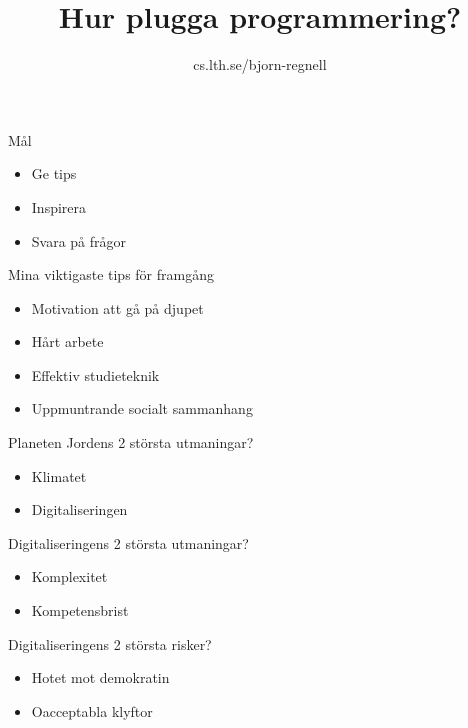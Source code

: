 \documentclass{lecturesimple}
\title{Hur plugga programmering?}
\author{cs.lth.se/bjorn-regnell}
\institute{}
\date{\DateOfShow}
\begin{document}
\frame{\titlepage}

\begin{Slide}{Mål}
  \begin{itemize}
    \item Ge tips
    \item Inspirera
    \item Svara på frågor
  \end{itemize}
\end{Slide}

\begin{Slide}{Mina viktigaste tips för framgång}
  \begin{itemize}
    \item Motivation att gå på djupet
    \item Hårt arbete
    \item Effektiv studieteknik
    \item Uppmuntrande socialt sammanhang
  \end{itemize}  
\end{Slide}


\begin{Slide}{Planeten Jordens 2 största utmaningar?}
  \pause\begin{itemize}
    \item Klimatet
    \item Digitaliseringen 
  \end{itemize}
\end{Slide}

\begin{Slide}{Digitaliseringens 2 största utmaningar?}
  \pause\begin{itemize}
    \item Komplexitet
    \item Kompetensbrist 
  \end{itemize}  
\end{Slide}



\begin{Slide}{Digitaliseringens 2 största risker?}
  \pause\begin{itemize}
    \item Hotet mot demokratin
    \item Oacceptabla klyftor
  \end{itemize}  
\end{Slide}
\end{document}
